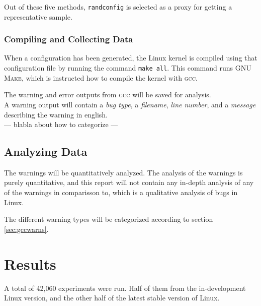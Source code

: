 \documentclass[a4paper,11pt]{report}
\newcommand{\textcode}[1]{\fboxsep=1pt\texttt{\colorbox{gray!20}{#1}}}
\begin{document}
Out of these five methods, \texttt{randconfig} is selected as a proxy for 
getting a representative sample.

            \subsection{Compiling and Collecting Data}

When a configuration has been generated, the Linux kernel is compiled using 
that configuration file by running the command \textcode{make all}. This 
command runs \textsc{GNU Make}, which is instructed how to compile the kernel with
\textsc{gcc}.

The warning and error outputs from \textsc{gcc} will be saved for analysis.
\\

A warning output will contain a \emph{bug type}, a \emph{filename}, \emph{line 
number}, and a \emph{message} describing the warning in english.
\\

--- blabla about how to categorize ---


            \section{Analyzing Data}
The warnings will be quantitatively analyzed.  The analysis of the warnings is 
purely quantitative, and this report will not contain any in-depth analysis of 
any of the warnings in comparisson to\cite{42bugs}, which is a qualitative 
analysis of bugs in Linux.

The different warning types will be categorized according to section 
\ref{sec:gccwarns}.


\newpage
\chapter{Results}

A total of 42,060 experiments were run. Half of them from the in-development 
Linux version, and the other half of the latest stable version of Linux.
\end{document}
